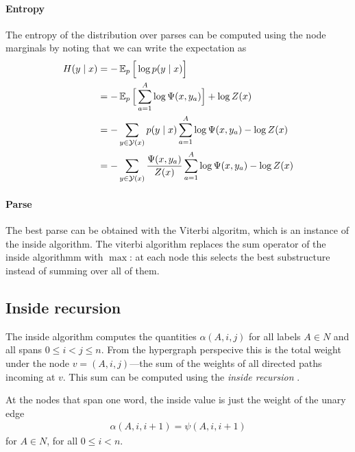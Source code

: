 \paragraph{Entropy}
The entropy of the distribution over parses can be computed using the node marginals by noting that we can write the expectation as
\begin{align*}
  H(y \mid x)
    &= - \operatorname{\mathbb{E}}_{p} \Big[ \log p(y \mid x) \Big]  \\
    &= - \operatorname{\mathbb{E}}_{p} \Big[ \sum_{a=1}^A \log \Psi(x, y_a) \Big] + \log Z(x)  \\
    &= - \sum_{ y \in \mathcal{Y}(x) } p(y \mid x) \sum_{a=1}^A \log \Psi(x, y_a) - \log Z(x)  \\
    &= - \sum_{ y \in \mathcal{Y}(x) } \frac{ \Psi(x, y_a) }{ Z(x) } \sum_{a=1}^A \log \Psi(x, y_a) - \log Z(x)  \\
\end{align*}

\paragraph{Parse}
The best parse can be obtained with the Viterbi algoritm, which is an instance of the inside algorithm. The viterbi algorithm replaces the sum operator of the inside algorithmm with $\max$: at each node this selects the best substructure instead of summing over all of them.

\subsection{Inside recursion}
  The inside algorithm computes the quantities $\alpha(A,i,j)$ for all labels $A \in N$ and all spans $0 \leq i < j \leq n$. From the hypergraph perspecive this is the total weight under the node $v = (A, i, j)$---the sum of the weights of all directed paths incoming at $v$. This sum can be computed using the \textit{inside recursion} \citep{goodman1999semiring}.

  At the nodes that span one word, the inside value is just the weight of the unary edge
  \begin{align}
      \label{eq:inside-base}
      \alpha(A, i, i+1) = \psi(A, i, i+1)
  \end{align}
  for $A \in N$, for all $0 \leq i < n$.

